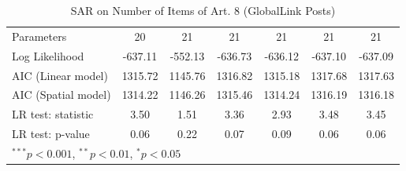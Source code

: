\begin{table}[!h]
\begin{center}
\begin{tabular}{l c c c c c c }
Parameters              & 20           & 21           & 21           & 21           & 21           & 21           \\
Log Likelihood          & -637.11      & -552.13      & -636.73      & -636.12      & -637.10      & -637.09      \\
AIC (Linear model)      & 1315.72      & 1145.76      & 1316.82      & 1315.18      & 1317.68      & 1317.63      \\
AIC (Spatial model)     & 1314.22      & 1146.26      & 1315.46      & 1314.24      & 1316.19      & 1316.18      \\
LR test: statistic      & 3.50         & 1.51         & 3.36         & 2.93         & 3.48         & 3.45         \\
LR test: p-value        & 0.06         & 0.22         & 0.07         & 0.09         & 0.06         & 0.06         \\
\bottomrule
\multicolumn{7}{l}{\scriptsize{$^{***}p<0.001$, $^{**}p<0.01$, $^*p<0.05$}}
\end{tabular}
\caption{SAR on Number of Items of Art. 8 (GlobalLink Posts)}
\label{table:coefficients}
\end{center}
\end{table}
